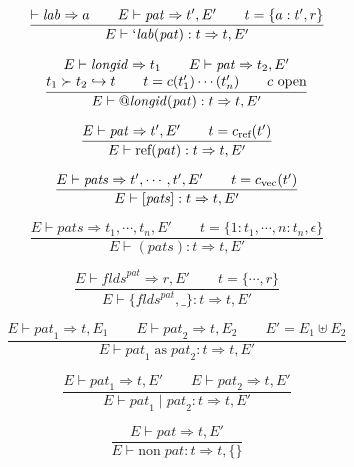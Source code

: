 \documentclass[twoside]{article}
\newcommand{\conarrow}{\hookrightarrow}
\newcommand{\x}[1]{\mathit{#1}}
\newcommand{\f}[1]{\mbox{#1}}
\renewcommand{\c}[1]{c_{\f{\scriptsize #1}}}
\newcommand{\lab}{\x{lab}}
\newcommand{\longid}{\x{longid}}
\newcommand{\flds}{\x{flds}}
\newcommand{\pat}{\x{pat}}
\newcommand{\pats}{\x{pats}}
\begin{document}
\begin{equation}
\frac{
\vdash \lab \Rightarrow a
\qquad
E \vdash \pat \Rightarrow t',E'
\qquad
t = \{a:t',r\}
}{
E \vdash `\lab(\pat) : t \Rightarrow t,E'
}
\end{equation}

\begin{equation}
\frac{
\begin{array}{@{}c@{}}
E \vdash \longid \Rightarrow t_1
\qquad
E \vdash \pat \Rightarrow t_2,E'
\\
t_1 \succ t_2 \conarrow t
\qquad
t = c(t_1')\cdots(t_n')
\qquad
\mbox{$c$ open}
\end{array}
}{
E \vdash @\longid(\pat) : t \Rightarrow t,E'
}
\end{equation}

\begin{equation}
\frac{
E \vdash \pat \Rightarrow t',E'
\qquad
t = \c{ref}(t')
}{
E \vdash \f{ref}(\pat) : t \Rightarrow t,E'
}
\end{equation}

\begin{equation}
\frac{
E \vdash \pats \Rightarrow t',\cdots,t',E'
\qquad
t = \c{vec}(t')
}{
E \vdash [\pats] : t \Rightarrow t,E'
}
\end{equation}

\begin{equation}
\frac{
E \vdash \pats \Rightarrow t_1,\cdots,t_n,E'
\qquad
t = \{1:t_1,\cdots,n:t_n,\epsilon\}
}{
E \vdash (\pats) : t \Rightarrow t,E'
}
\end{equation}

\begin{equation}
\frac{
E \vdash \flds^\pat \Rightarrow r,E'
\qquad
t = \{\cdots,r\}
}{
E \vdash \{\flds^\pat,\_\} : t \Rightarrow t,E'
}
\end{equation}

\begin{equation}
\frac{
E \vdash \pat_1 \Rightarrow t,E_1
\qquad
E \vdash \pat_2 \Rightarrow t,E_2
\qquad
E' = E_1 \uplus E_2
}{
E \vdash \pat_1\;\f{as}\;\pat_2 : t \Rightarrow t,E'
}
\end{equation}

\begin{equation}
\frac{
E \vdash \pat_1 \Rightarrow t,E'
\qquad
E \vdash \pat_2 \Rightarrow t,E'
}{
E \vdash \pat_1\;|\;\pat_2 : t \Rightarrow t,E'
}
\end{equation}

\begin{equation}
\frac{
E \vdash \pat \Rightarrow t,E'
}{
E \vdash \f{non}\;\pat : t \Rightarrow t,\{\}
}
\end{equation}
\end{document}
